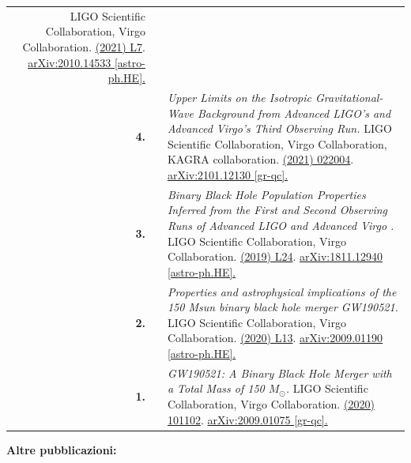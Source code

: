 {\begin{longtable}{rp{0.3cm}p{15.8cm}}
\newline{}
LIGO Scientific Collaboration, Virgo Collaboration.
\newline{}
\href{https://iopscience.iop.org/article/10.3847/2041-8213/abe949}{\apjl 913 (2021) L7}. \href{https://arxiv.org/abs/2010.14533}{arXiv:2010.14533 [astro-ph.HE].}
\vspace{0.09cm}\\
%
\textbf{4.} & & \textit{Upper Limits on the Isotropic Gravitational-Wave Background from Advanced LIGO's and Advanced Virgo's Third Observing Run.}
\newline{}
LIGO Scientific Collaboration, Virgo Collaboration, KAGRA collaboration.
\newline{}
\href{https://journals.aps.org/prd/abstract/10.1103/PhysRevD.104.022004}{\prd 104 (2021) 022004}. \href{https://arxiv.org/abs/2101.12130}{arXiv:2101.12130 [gr-qc].}
\vspace{0.09cm}\\
%
\textbf{3.} & & \textit{Binary Black Hole Population Properties Inferred from the First and Second Observing Runs of Advanced LIGO and Advanced Virgo .}
\newline{}
LIGO Scientific Collaboration, Virgo Collaboration.
\newline{}
\href{https://iopscience.iop.org/article/10.3847/2041-8213/ab3800}{\apj 882 (2019)  L24}. \href{https://arxiv.org/abs/1811.12940}{arXiv:1811.12940 [astro-ph.HE].}
\vspace{0.09cm}\\
%
\textbf{2.} & & \textit{Properties and astrophysical implications of the 150 Msun binary black hole merger GW190521.}
\newline{}
LIGO Scientific Collaboration, Virgo Collaboration.
\newline{}
\href{https://iopscience.iop.org/article/10.3847/2041-8213/aba493}{\apjl 900 (2020) L13}. \href{https://arxiv.org/abs/2009.01190}{arXiv:2009.01190 [astro-ph.HE].}
\vspace{0.09cm}\\
%
\textbf{1.} & & \textit{GW190521: A Binary Black Hole Merger with a Total Mass of 150 $M_\odot$.}
\newline{}
LIGO Scientific Collaboration, Virgo Collaboration.
\newline{}
\href{https://journals.aps.org/prl/abstract/10.1103/PhysRevLett.125.101102}{\prl 125 (2020) 101102}. \href{https://arxiv.org/abs/2009.01075}{arXiv:2009.01075 [gr-qc].}
\vspace{0.09cm}\\
%
\end{longtable} }
\textcolor{color1}{\textbf{Altre pubblicazioni:}}
\vspace{-0.5cm}

